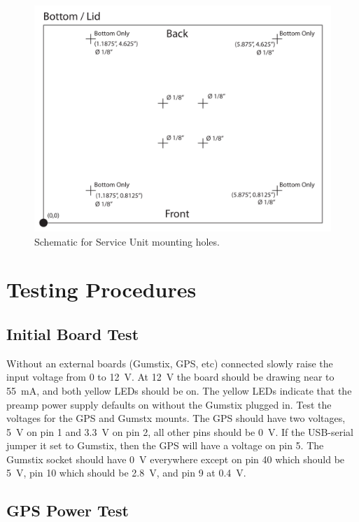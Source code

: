 \begin{landscape}
\begin{figure}[ht!]
   \centering
   \includegraphics[scale=1]{Appendix/Figures/su_box_holes_bottom.pdf} 
   \caption{Schematic for Service Unit mounting holes.}
   \label{su:fig:suBoxBot}
\end{figure}
\end{landscape}

\section{Testing Procedures}

\subsection{Initial Board Test}
\label{su:subsection:suTest1}

Without an external boards (Gumstix, GPS, etc) connected slowly raise the input voltage from 0 to 12~V. 
At 12~V the board should be drawing near to 55~mA, and both yellow LEDs should be on.
The yellow LEDs indicate that the preamp power supply defaults on without the Gumstix plugged in.
Test the voltages for the GPS and Gumstx mounts.
The GPS should have two voltages, 5~V on pin 1 and 3.3~V on pin 2, all other pins should be 0~V.
If the USB-serial jumper it set to Gumstix, then the GPS will have a voltage on pin 5.
The Gumstix socket should have 0~V everywhere except on pin 40 which should be 5~V, pin 10 which should be 2.8~V, and pin 9 at 0.4~V.

\subsection{GPS Power Test}
\label{su:subsection:suTest2}

